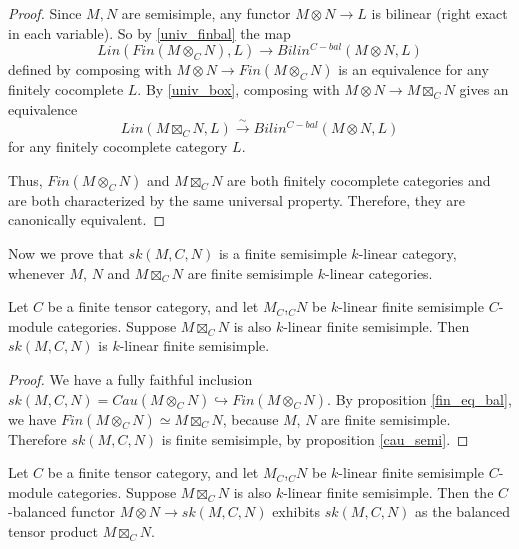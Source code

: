\begin{proof}

  \noindent Since $M,N$ are semisimple, any functor $M\otimes N\to L$ is
  bilinear (right exact in each variable).
  So by \ref{univ_finbal} the map \[Lin(Fin(M \otimes_{C} N), L) \to
  Bilin^{C-bal}(M \otimes N, L)\] defined by composing with $M\otimes N\to
  Fin(M\otimes_C N)$ is an equivalence for any finitely cocomplete $L$.
  By \ref{univ_box}, composing with $M\otimes N\to M\boxtimes_C N$ gives
  an equivalence \[Lin(M \boxtimes_{C} N, L) \xrightarrow{\sim}
  Bilin^{C-bal}(M \otimes N, L)\] for any finitely cocomplete category $L$.

  Thus, $Fin(M\otimes_C N)$ and $M \boxtimes_{C} N$ are both finitely cocomplete
  categories and are both characterized by the same universal property.
  Therefore, they are canonically equivalent.
\end{proof}

Now we prove that $sk(M,C,N)$ is a finite semisimple $k$-linear category,
whenever $M$, $N$ and $M\boxtimes_C N$ are finite semisimple $k$-linear
categories.

\begin{lemma}\label{semisimple}
  Let $C$ be a finite tensor category, and let $M_C$,$_{C}N$ be $k$-linear finite
  semisimple $C$-module categories. Suppose $M\boxtimes_C N$ is also
  $k$-linear finite semisimple.
  Then $sk(M,C,N)$ is $k$-linear finite
  semisimple.
\end{lemma}

\begin{proof}
  We have a fully faithful inclusion $sk(M,C,N)=Cau(M\otimes_C
  N)\hookrightarrow Fin(M\otimes_C N)$. By proposition \ref{fin_eq_bal}, we
  have $Fin(M\otimes_C N)\simeq M\boxtimes_C N$, because $M$, $N$ are finite
  semisimple. Therefore $sk(M,C,N)$ is finite semisimple, by
  proposition \ref{cau_semi}.
\end{proof}

\begin{lemma}\label{sk_bal}
  Let $C$ be a finite tensor category, and let $M_C$,$_{C}N$ be $k$-linear finite
  semisimple $C$-module categories. Suppose $M\boxtimes_C N$ is also
  $k$-linear finite semisimple. Then the $C$-balanced functor $M\otimes N\to
  sk(M,C,N)$ exhibits $sk(M,C,N)$ as the balanced tensor product $M\boxtimes_C
  N$.
\end{lemma}

